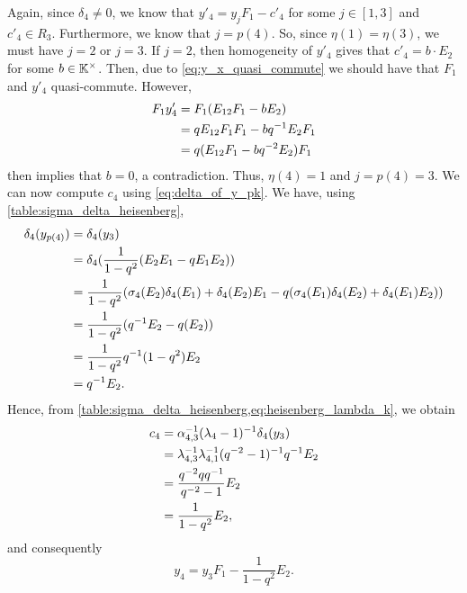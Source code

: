 \begin{example}
	Again, since $\delta_4 \neq 0$, we know that $y'_4 = y_j F_1 -c'_4$ for some $j \in [1, 3]$ and $c'_4 \in R_3$. Furthermore, we know that $j = p(4)$. So, since $\eta(1) = \eta(3)$, we must have $j = 2$ or $j = 3$. If $j = 2$, then homogeneity of $y'_4$ gives that $c'_4 = b \cdot E_2$ for some $b \in \mathbb{K}^\times$. Then, due to \cref{eq:y_x_quasi_commute} we should have that $F_1$ and $y'_4$ quasi-commute. However,
	\begin{align*}
		F_1 y'_4 
		&= F_1 (E_{12}F_1 - b E_2)\\
		&= q E_{12} F_1 F_1 - bq ^{-1}  E_2 F_1 \\
		&= q (E_{12} F_1 - b q^{-2} E_2) F_1
	\end{align*}
	then implies that $b = 0$, a contradiction. Thus, $\eta(4) = 1$ and $j = p(4) = 3$. We can now compute $c_4$ using \cref{eq:delta_of_y_pk}. We have, using \cref{table:sigma_delta_heisenberg},
	\begin{align*}
		\delta_4(y_{p(4)})
		&= \delta_4(y_3)\\
		&= \delta_4(\frac{1}{1-q^2}(E_2 E_1 - q E_1 E_2)) \\
		&= \frac{1}{1-q^2}(\sigma_4 (E_2)\delta_4(E_1) + \delta_4(E_2)E_1 - q(\sigma_4(E_1)\delta_4(E_2) + \delta_4(E_1)E_2)) \\
		&= \frac{1}{1-q^2}(q^{-1} E_2  - q(E_2)) \\
		&= \frac{1}{1-q^2} q^{-1} (1- q^2) E_2 \\
		&= q^{-1} E_2.
	\end{align*}
	Hence, from \cref{table:sigma_delta_heisenberg,eq:heisenberg_lambda_k}, we obtain
	\begin{align*}
		c_4 &= \alpha_{4,3}^{-1} (\lambda_4 - 1)^{-1} \delta_4(y_3)\\
		 &= \lambda_{4,3}^{-1}\lambda_{4,1}^{-1} (q^{-2} -1)^{-1} q^{-1} E_2\\
		 &= \frac{q^{-2}qq^{-1}}{q^{-2} - 1} E_2\\
		 &= \frac{1}{1 - q^2} E_2,
	\end{align*}
	and consequently
	\begin{equation*}
		y_4 = y_3 F_1 - \frac{1}{1-q^2}E_2.
	\end{equation*}


\end{example}
